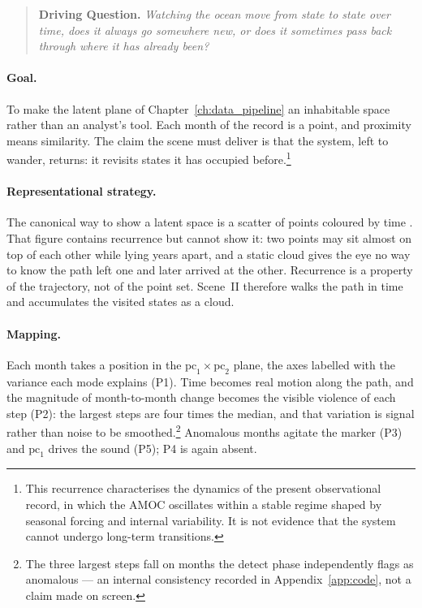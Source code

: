 \begin{quote}
\textbf{Driving Question.} \emph{Watching the ocean move from state to state over time, does it always go somewhere new, or does it sometimes pass back through where it has already been?}
\end{quote}



\paragraph{Goal.} To make the latent plane of Chapter~\ref{ch:data_pipeline} an inhabitable space rather than an analyst's tool. Each month of the record is a point, and proximity means similarity. The claim the scene must deliver is that the system, left to wander, returns: it revisits states it has occupied before.\footnote{This recurrence characterises the dynamics of the present observational record, in which the AMOC oscillates within a stable regime shaped by seasonal forcing and internal variability. It is not evidence that the system cannot undergo long-term transitions.}

\paragraph{Representational strategy.} The canonical way to show a latent space is a scatter of points coloured by time \parencite{sacha2018}. That figure contains recurrence but cannot show it: two points may sit almost on top of each other while lying years apart, and a static cloud gives the eye no way to know the path left one and later arrived at the other. Recurrence is a property of the trajectory, not of the point set. Scene~II therefore walks the path in time and accumulates the visited states as a cloud.

\paragraph{Mapping.} Each month takes a position in the $\mathrm{pc}_1 \times \mathrm{pc}_2$ plane, the axes labelled with the variance each mode explains (P1). Time becomes real motion along the path, and the magnitude of month-to-month change becomes the visible violence of each step (P2): the largest steps are four times the median, and that variation is signal rather than noise to be smoothed.\footnote{The three largest steps fall on months the detect phase independently flags as anomalous --- an internal consistency recorded in Appendix~\ref{app:code}, not a claim made on screen.} Anomalous months agitate the marker (P3) and $\mathrm{pc}_1$ drives the sound (P5); P4 is again absent.

